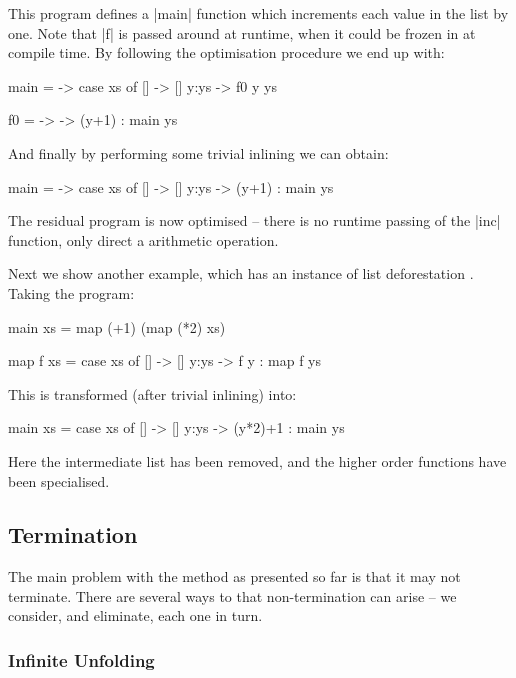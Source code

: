 \documentclass{llncs}
\begin{document}
This program defines a |main| function which increments each value in the list by one. Note that |f| is passed around at runtime, when it could be frozen in at compile time. By following the optimisation procedure we end up with:

\begin{code}
main = \xs -> case  xs of
                    []    -> []
                    y:ys  -> f0 y ys

f0 = \y -> \ys -> (y+1) : main ys
\end{code}

And finally by performing some trivial inlining we can obtain:

\begin{code}
main = \xs -> case  xs of
                    []    -> []
                    y:ys  -> (y+1) : main ys
\end{code}

The residual program is now optimised -- there is no runtime passing of the |inc| function, only direct a arithmetic operation.

Next we show another example, which has an instance of list deforestation \cite{wadler:deforestation}. Taking the program:

\begin{code}
main xs = map (+1) (map (*2) xs)

map f xs = case  xs of
                 []    -> []
                 y:ys  -> f y : map f ys
\end{code}

This is transformed (after trivial inlining) into:

\begin{code}
main xs = case  xs of
               []    -> []
               y:ys  -> (y*2)+1 : main ys
\end{code}

Here the intermediate list has been removed, and the higher order functions have been specialised.


\subsection{Termination}
\label{sec:termination}

The main problem with the method as presented so far is that it may not terminate. There are several ways to that non-termination can arise -- we consider, and eliminate, each one in turn.

\subsubsection{Infinite Unfolding}
\end{document}

